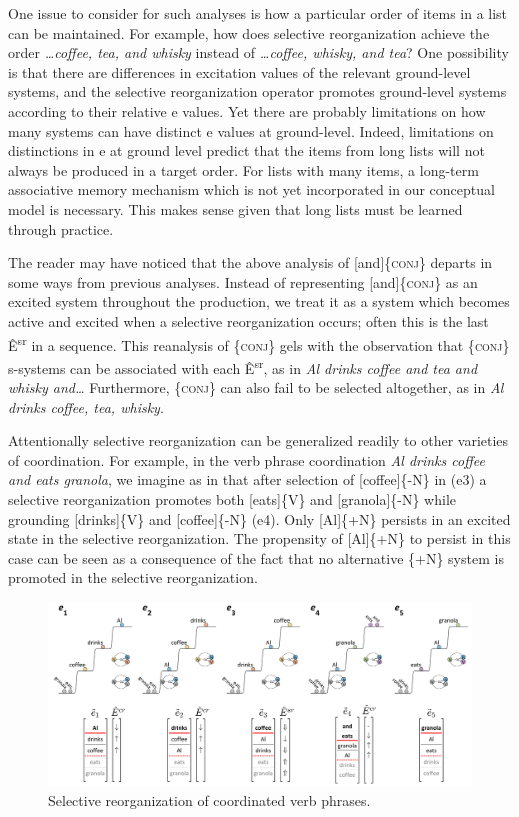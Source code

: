  One issue to consider for such analyses is how a particular order of items in a list can be maintained. For example, how does selective reorganization achieve the order \textit{…coffee, tea, and whisky} instead of \textit{…coffee, whisky, and tea}? One possibility is that there are differences in excitation values of the relevant ground-level systems, and the selective reorganization operator promotes ground-level systems according to their relative e values. Yet there are probably limitations on how many systems can have distinct e values at ground-level. Indeed, limitations on distinctions in e at ground level predict that the items from long lists will not always be produced in a target order. For lists with many items, a long-term associative memory mechanism which is not yet incorporated in our conceptual model is necessary. This makes sense given that long lists must be learned through practice.

  The reader may have noticed that the above analysis of [and]\{\textsc{conj}\} departs in some ways from previous analyses. Instead of representing [and]\{\textsc{conj}\} as an excited system throughout the production, we treat it as a system which becomes active and excited when a selective reorganization occurs; often this is the last Ê\textsuperscript{sr} in a sequence. This reanalysis of \{\textsc{conj}\} gels with the observation that \{\textsc{conj}\} s-systems can be associated with each Ê\textsuperscript{sr}, as in \textit{Al drinks coffee and tea and whisky and…} Furthermore, \{\textsc{conj}\} can also fail to be selected altogether, as in \textit{Al drinks coffee, tea, whisky}.

  Attentionally selective reorganization can be generalized readily to other varieties of coordination. For example, in the verb phrase coordination \textit{Al drinks coffee and eats granola}, we imagine as in {} that after selection of [coffee]\{-N\} in (e3) a selective reorganization promotes both [eats]\{V\} and [granola]\{-N\} while grounding [drinks]\{V\} and [coffee]\{-N\} (e4). Only [Al]\{+N\} persists in an excited state in the selective reorganization. The propensity of [Al]\{+N\} to persist in this case can be seen as a consequence of the fact that no alternative \{+N\} system is promoted in the selective reorganization.

  
\begin{figure}
\includegraphics[width=\textwidth]{figures/Tilsen-img100.png}
\caption{Selective reorganization of coordinated verb phrases.}
\label{fig:4:50}
\end{figure}
 


